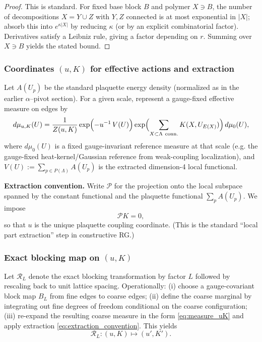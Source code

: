 \begin{proof}
This is standard.
For fixed base block $B$ and polymer $X\ni B$, the number of decompositions $X=Y\cup Z$ with $Y,Z$ connected is at most exponential in $|X|$;
absorb this into $e^{\kappa|X|}$ by reducing $\kappa$ (or by an explicit combinatorial factor).
Derivatives satisfy a Leibniz rule, giving a factor depending on $r$.
Summing over $X\ni B$ yields the stated bound.
\end{proof}

\subsubsection{Coordinates \texorpdfstring{$(u,K)$}{(u,K)} for effective actions and extraction}
\label{subsec:coordinates_extraction}

Let $A(U_p)$ be the standard plaquette energy density (normalized as in the earlier $\alpha$--pivot section).
For a given scale, represent a gauge-fixed effective measure on edges by
\begin{equation}\label{eq:measure_uK}
 d\mu_{u,K}(U)
 = \frac{1}{Z(u,K)}\exp\Bigl(-u^{-1}\,V(U)\Bigr)
 \exp\Bigl(\sum_{X\subset\Lambda\ \mathrm{conn.}} K(X,U_{E(X)})\Bigr)\,d\mu_0(U),
\end{equation}
where $d\mu_0(U)$ is a fixed gauge-invariant reference measure at that scale (e.g. the gauge-fixed heat-kernel/Gaussian reference from weak-coupling localization), and $V(U):=\sum_{p\in P(\Lambda)}A(U_p)$ is the extracted dimension-4 local functional.

\medskip
\noindent\textbf{Extraction convention.}
Write $\mathcal P$ for the projection onto the local subspace spanned by the constant functional and the plaquette functional
$\sum_{p}A(U_p)$.
We impose
\begin{equation}\label{eq:extraction_convention}
 \mathcal P K = 0,
\end{equation}
so that $u$ is the unique plaquette coupling coordinate.
(This is the standard ``local part extraction'' step in constructive RG.)

\subsubsection{Exact blocking map on \texorpdfstring{$(u,K)$}{(u,K)}}
\label{subsec:exact_blocking_map}

Let $\mathcal R_L$ denote the exact blocking transformation by factor $L$ followed by rescaling back to unit lattice spacing.
Operationally:
(i) choose a gauge-covariant block map $B_L$ from fine edges to coarse edges;
(ii) define the coarse marginal by integrating out fine degrees of freedom conditional on the coarse configuration;
(iii) re-expand the resulting coarse measure in the form \eqref{eq:measure_uK} and apply extraction \eqref{eq:extraction_convention}.
This yields
\[
\boxed{\ \mathcal R_L:(u,K)\mapsto(u',K').\ }
\]


